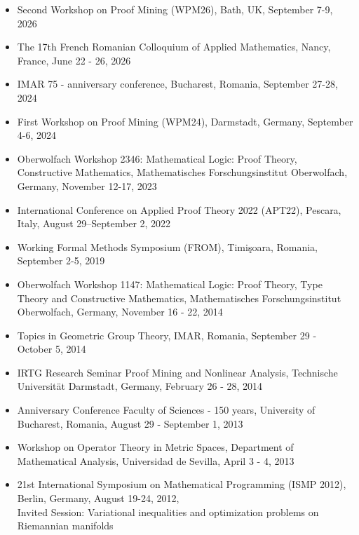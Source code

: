 \documentclass[12pt]{article}
\begin{document}
\begin{itemize}

\item Second Workshop on Proof Mining (WPM26), Bath, UK, September 7-9, 2026

 \item The 17th French Romanian Colloquium of Applied Mathematics, Nancy, France, June 22 - 26, 2026
 
\item IMAR 75 - anniversary conference, Bucharest, Romania,  September 27-28, 2024

\item First Workshop on Proof Mining (WPM24), Darmstadt, Germany, September 4-6, 2024

\item Oberwolfach Workshop 2346: Mathematical Logic: Proof Theory, Constructive Mathematics, Mathematisches Forschungsinstitut Oberwolfach,  Germany, 
November 12-17, 2023

\item International Conference on Applied Proof Theory 2022 (APT22), Pescara, Italy, August 29–September 2, 2022

\item Working Formal Methods Symposium (FROM), Timi\c soara, Romania, September 2-5, 2019

\item Oberwolfach Workshop 1147: Mathematical Logic: Proof Theory, Type Theory and Constructive Mathematics, Mathematisches Forschungsinstitut Oberwolfach,  Germany, 
November 16 - 22, 2014

\item Topics in Geometric Group Theory, IMAR, Romania, September 29 - October 5, 2014

\item IRTG Research Seminar Proof Mining and Nonlinear Analysis,  
Technische Universit\"{a}t Darmstadt, Germany,  February 26 - 28, 2014

\item   Anniversary Conference Faculty of Sciences - 150 years, University of Bucharest, Romania, August 29 -  September 1, 2013

\item Workshop on Operator Theory in Metric Spaces, Department of Mathematical Analysis, Universidad de Sevilla, April 3 - 4, 2013

\item 21st International Symposium on Mathematical Programming (ISMP 2012), Berlin, Germany, August 19-24, 2012,\\
Invited Session: Variational inequalities and optimization problems on Riemannian manifolds


\end{itemize}
\end{document}
